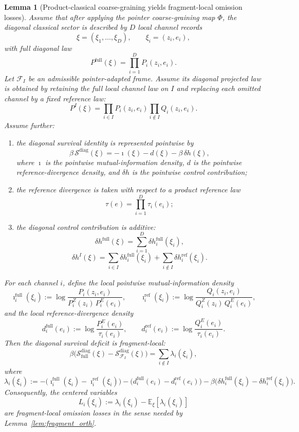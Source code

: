 \documentclass[12pt]{article}
\newtheorem{lemma}[theorem]{Lemma}
\theoremstyle{definition}
\theoremstyle{remark}
\begin{document}
\begin{lemma}[Product-classical coarse-graining yields fragment-local omission losses]\label{lem:product_classical}
Assume that after applying the pointer coarse-graining map \(\Phi\), the
diagonal classical sector is described by \(D\) local channel records
\[
\xi=(\xi_1,\dots,\xi_D),
\qquad
\xi_i=(z_i,e_i),
\]
with full diagonal law
\[
P^{\mathrm{full}}(\xi)
=
\prod_{i=1}^D P_i(z_i,e_i).
\]
Let \(\mathcal F_I\) be an admissible pointer-adapted frame. Assume its
diagonal projected law is obtained by retaining the full local channel
law on \(I\) and replacing each omitted channel by a fixed reference
law:
\[
P^{I}(\xi)
=
\prod_{i\in I} P_i(z_i,e_i)
\prod_{i\notin I} Q_i(z_i,e_i).
\]
Assume further:
\begin{enumerate}
\item the diagonal survival identity is represented pointwise by
  \[
  \beta\,\mathcal S^{\mathrm{diag}}(\xi)
  =
  -\imath(\xi)-d(\xi)-\beta\,\delta h(\xi),
  \]
  where \(\imath\) is the pointwise mutual-information density, \(d\) is
  the pointwise reference-divergence density, and \(\delta h\) is the
  pointwise control contribution;
\item the reference divergence is taken with respect to a product
  reference law
  \[
  \tau(e)=\prod_{i=1}^D \tau_i(e_i);
  \]
\item the diagonal control contribution is additive:
  \[
  \delta h^{\mathrm{full}}(\xi)
  =
  \sum_{i=1}^D \delta h_i^{\mathrm{full}}(\xi_i),
  \]
  \[
  \delta h^{I}(\xi)
  =
  \sum_{i\in I}\delta h_i^{\mathrm{full}}(\xi_i)
  +
  \sum_{i\notin I}\delta h_i^{\mathrm{ref}}(\xi_i).
  \]
\end{enumerate}
For each channel \(i\), define the local pointwise mutual-information
density
\[
\imath_i^{\mathrm{full}}(\xi_i)
:=
\log\frac{P_i(z_i,e_i)}{P_i^Z(z_i)\,P_i^E(e_i)},
\qquad
\imath_i^{\mathrm{ref}}(\xi_i)
:=
\log\frac{Q_i(z_i,e_i)}{Q_i^Z(z_i)\,Q_i^E(e_i)},
\]
and the local reference-divergence density
\[
d_i^{\mathrm{full}}(e_i)
:=
\log\frac{P_i^E(e_i)}{\tau_i(e_i)},
\qquad
d_i^{\mathrm{ref}}(e_i)
:=
\log\frac{Q_i^E(e_i)}{\tau_i(e_i)}.
\]
Then the diagonal survival deficit is fragment-local:
\[
\beta\bigl(
\mathcal S_{\mathrm{full}}^{\mathrm{diag}}(\xi)
-
\mathcal S_{\mathcal F_I}^{\mathrm{diag}}(\xi)
\bigr)
=
\sum_{i\notin I}\lambda_i(\xi_i),
\]
where
\[
\lambda_i(\xi_i)
:=
-\bigl(\imath_i^{\mathrm{full}}(\xi_i)-\imath_i^{\mathrm{ref}}(\xi_i)\bigr)
-\bigl(d_i^{\mathrm{full}}(e_i)-d_i^{\mathrm{ref}}(e_i)\bigr)
-\beta\bigl(\delta h_i^{\mathrm{full}}(\xi_i)-\delta h_i^{\mathrm{ref}}(\xi_i)\bigr).
\]
Consequently, the centered variables
\[
L_i(\xi_i):=\lambda_i(\xi_i)-\mathbb E_\xi[\lambda_i(\xi_i)]
\]
are fragment-local omission losses in the sense needed by
Lemma~\ref{lem:fragment_orth}.
\end{lemma}
\end{document}
